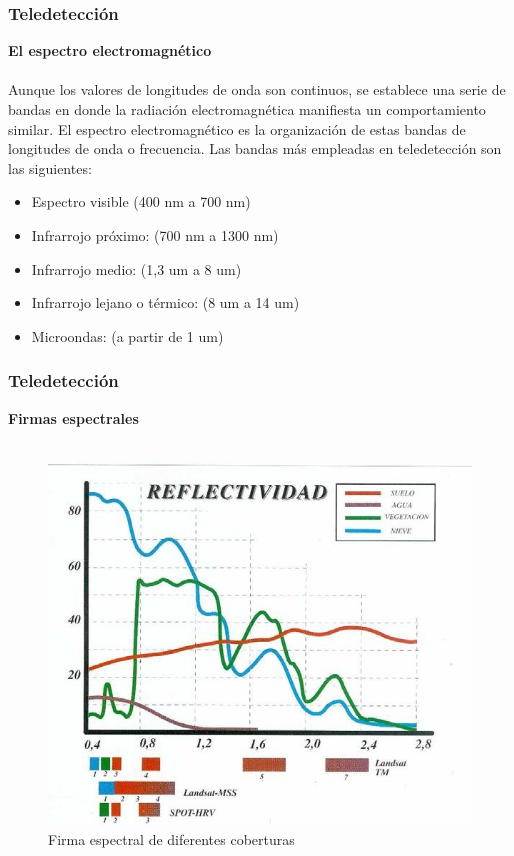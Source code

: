 \documentclass[xcolor=table]{beamer}
\begin{document}
\begin{frame}\frametitle{Teledetecci\'on}
\textbf{El espectro electromagn\'etico}\\~\\
Aunque los valores de longitudes de onda son continuos, se establece una serie de bandas en donde la radiación electromagnética manifiesta un comportamiento similar. El espectro electromagnético es la organización de estas bandas de longitudes de onda o frecuencia.
Las bandas m\'as empleadas en teledetecci\'on son las siguientes:
\begin{itemize}
\item Espectro visible (400 nm a 700 nm)
\item Infrarrojo próximo: (700 nm a 1300 nm)
\item Infrarrojo medio: (1,3 um a 8 um)
\item Infrarrojo lejano o térmico: (8 um a 14 um)
\item Microondas: (a partir de 1 um)
\end{itemize}

	
\end{frame}
\begin{frame}\frametitle{Teledetecci\'on}
	\textbf{Firmas espectrales}\\~\\	

\begin{figure}
\centering
\includegraphics[width=0.7\linewidth]{imagenes/espectral}
\caption{Firma espectral de diferentes coberturas}
\label{fig:espectral}
\end{figure}

\end{frame}
\end{document}
